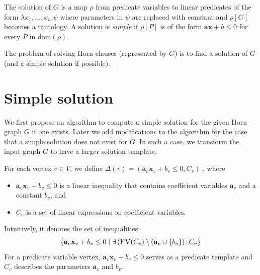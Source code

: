 The solution of $G$ is a map $\rho$ from predicate variables to linear
predicates of the form $\lambda x_1, \ldots ,x_n. \psi$ where
parameters in $\psi$ are replaced with constant and $\rho[G]$ becomes
a tautology.  A solution is \textit{simple} if $\rho[P]$ is of the
form $\mathbf{a} \mathbf{x} + b \leq 0$ for every $P$ in
$\mathrm{dom}(\rho)$.

The problem of solving Horn clauses (represented by $G$) is to find a
solution of $G$ (and a simple solution if possible).

\section{Simple solution}

We first propose an algorithm to compute a simple solution for the
given Horn graph $G$ if one exists.  Later we add modifications to the
algorithm for the case that a simple solution does not exist for $G$.
In such a case, we transform the input graph $G$ to have a larger
solution template.

For each vertex $v \in V$, we define
$\Delta(v) = (\mathbf{a}_v \mathbf{x}_v + b_v \leq 0, C_v)$
, where
\begin{itemize}
\item $\mathbf{a}_v \mathbf{x}_v + b_v \leq 0$ is a linear inequality
  that contains coefficient variables $\mathbf{a}_v$ and a constant
  $b_v$, and
\item $C_v$ is a set of linear expressions on coefficient variables.
\end{itemize}
Intuitively, it denotes the set of inequalities:
\begin{align*}
\left\lbrace
 \mathbf{a}_v \mathbf{x}_v + b_v \leq 0 \mid
 \exists \left( \textsc{FV}(C_v)
  \setminus (\mathbf{a}_v \cup \left\lbrace b_v \right\rbrace
 \right); C_v
\right\rbrace
\end{align*}
For a predicate variable vertex,
$\mathbf{a}_v \mathbf{x}_v + b_v \leq 0$ serves as a predicate
template and $C_v$ describes the parameters $\mathbf{a}_v$ and $b_v$.

